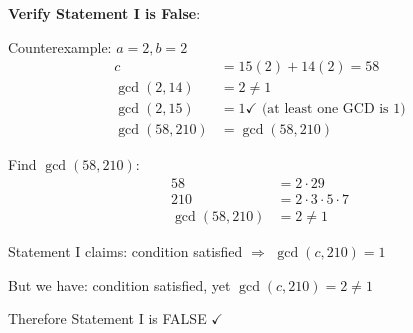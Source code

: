 \documentclass[12pt]{article}
\begin{document}
\begin{verificationbox}
\textbf{Verify Statement I is False}:

Counterexample: $a=2, b=2$
\begin{align*}
    c &= 15(2) + 14(2) = 58\\
    \gcd(2, 14) &= 2 \neq 1\\
    \gcd(2, 15) &= 1 \checkmark \text{ (at least one GCD is 1)}\\
    \gcd(58, 210) &= \gcd(58, 210)
\end{align*}

Find $\gcd(58, 210)$:
\begin{align*}
    58 &= 2 \cdot 29\\
    210 &= 2 \cdot 3 \cdot 5 \cdot 7\\
    \gcd(58, 210) &= 2 \neq 1
\end{align*}

Statement I claims: condition satisfied $\Rightarrow$ $\gcd(c,210)=1$

But we have: condition satisfied, yet $\gcd(c,210)=2 \neq 1$

Therefore Statement I is FALSE $\checkmark$
\end{verificationbox}
\end{document}
